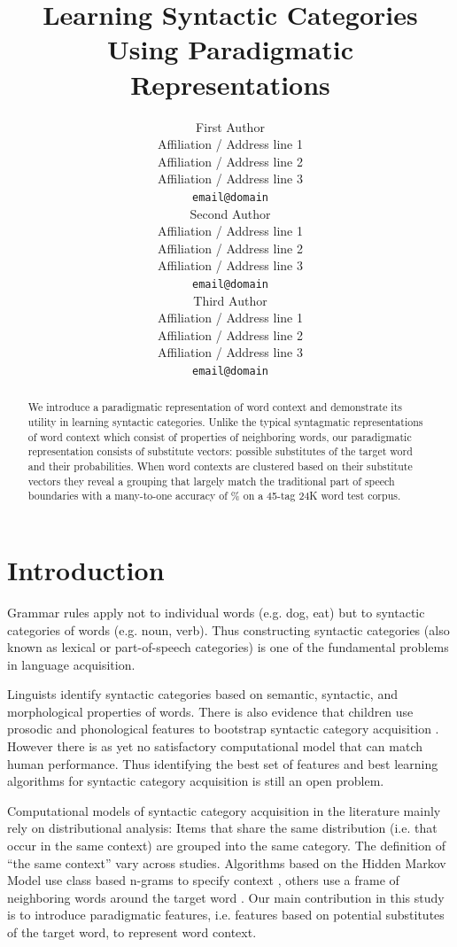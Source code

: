 \documentclass[11pt]{article}
\title{Learning Syntactic Categories Using Paradigmatic Representations}
\author{First Author \\
  Affiliation / Address line 1 \\
  Affiliation / Address line 2 \\
  Affiliation / Address line 3 \\
  {\tt email@domain} \\\And
  Second Author \\
  Affiliation / Address line 1 \\
  Affiliation / Address line 2 \\
  Affiliation / Address line 3 \\
  {\tt email@domain} \\\And
  Third Author \\
  Affiliation / Address line 1 \\
  Affiliation / Address line 2 \\
  Affiliation / Address line 3 \\
  {\tt email@domain} \\}
\date{}
\begin{document}
\maketitle
\begin{abstract}
We introduce a paradigmatic representation of word context and
demonstrate its utility in learning syntactic categories.  Unlike the
typical syntagmatic representations of word context which consist of
properties of neighboring words, our paradigmatic representation
consists of substitute vectors: possible substitutes of the target
word and their probabilities.  When word contexts are clustered based
on their substitute vectors they reveal a grouping that largely match
the traditional part of speech boundaries with a many-to-one accuracy
of \collapseResult\% on a 45-tag 24K word test corpus.
\end{abstract}

\section{Introduction}
\label{sec:intro}

Grammar rules apply not to individual words (e.g. dog, eat) but to
syntactic categories of words (e.g. noun, verb).  Thus constructing
syntactic categories (also known as lexical or part-of-speech
categories) is one of the fundamental problems in language
acquisition.

Linguists identify syntactic categories based on semantic, syntactic,
and morphological properties of words.  There is also evidence that
children use prosodic and phonological features to bootstrap syntactic
category acquisition \cite{ambridge2011child}.  However there is as
yet no satisfactory computational model that can match human
performance.  Thus identifying the best set of features and best
learning algorithms for syntactic category acquisition is still an
open problem.

Computational models of syntactic category acquisition in the
literature mainly rely on distributional analysis: Items that share
the same distribution (i.e. that occur in the same context) are
grouped into the same category.  The definition of ``the same
context'' vary across studies.  Algorithms based on the Hidden Markov
Model use class based n-grams to specify context
\cite{Brown:1992:CNG:176313.176316}, others use a frame of neighboring
words around the target word \cite{Schutze:1995:DPT:976973.976994}.
Our main contribution in this study is to introduce paradigmatic
features, i.e. features based on potential substitutes of the target
word, to represent word context.
\end{document}
